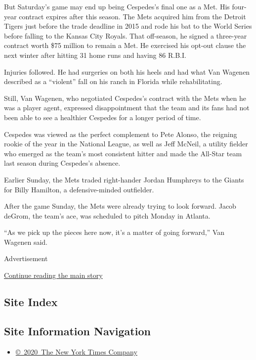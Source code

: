But Saturday's game may end up being Cespedes's final one as a Met. His
four-year contract expires after this season. The Mets acquired him from
the Detroit Tigers just before the trade deadline in 2015 and rode his
bat to the World Series before falling to the Kansas City Royals. That
off-season, he signed a three-year contract worth \$75 million to remain
a Met. He exercised his opt-out clause the next winter after hitting 31
home runs and having 86 R.B.I.

Injuries followed. He had surgeries on both his heels and had what Van
Wagenen described as a ``violent'' fall on his ranch in Florida while
rehabilitating.

Still, Van Wagenen, who negotiated Cespedes's contract with the Mets
when he was a player agent, expressed disappointment that the team and
its fans had not been able to see a healthier Cespedes for a longer
period of time.

Cespedes was viewed as the perfect complement to Pete Alonso, the
reigning rookie of the year in the National League, as well as Jeff
McNeil, a utility fielder who emerged as the team's most consistent
hitter and made the All-Star team last season during Cespedes's absence.

Earlier Sunday, the Mets traded right-hander Jordan Humphreys to the
Giants for Billy Hamilton, a defensive-minded outfielder.

After the game Sunday, the Mets were already trying to look forward.
Jacob deGrom, the team's ace, was scheduled to pitch Monday in Atlanta.

``As we pick up the pieces here now, it's a matter of going forward,''
Van Wagenen said.

Advertisement

\protect\hyperlink{after-bottom}{Continue reading the main story}

\hypertarget{site-index}{%
\subsection{Site Index}\label{site-index}}

\hypertarget{site-information-navigation}{%
\subsection{Site Information
Navigation}\label{site-information-navigation}}

\begin{itemize}
\tightlist
\item
  \href{https://help.nytimes.com/hc/en-us/articles/115014792127-Copyright-notice}{©~2020~The
  New York Times Company}
\end{itemize}

